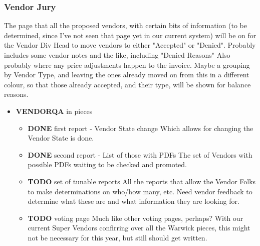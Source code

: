 \documentclass[captions=tablesignature]{scrartcl}
\begin{document}
\subsubsection{Vendor Jury}
\label{sec-3-1-11}
The page that all the proposed vendors, with certain bits of
information (to be determined, since I've not seen that page yet
in our current system) will be on for the Vendor Div Head to move
vendors to either "Accepted" or "Denied".  Probably includes some
vendor notes and the like, including "Denied Reasons" Also
probably where any price adjustments happen to the invoice.  Maybe
a grouping by Vendor Type, and leaving the ones already moved on
from this in a different colour, so that those already accepted,
and their type, will be shown for balance reasons.
\begin{itemize}
\item {\bfseries\sffamily VENDORQA} in pieces
\label{sec-3-1-11-1}
\begin{itemize}
\item {\bfseries\sffamily DONE} first report - Vendor State change
\label{sec-3-1-11-1-1}
Which allows for changing the Vendor State is done.

\item {\bfseries\sffamily DONE} second report - List of those with PDFs
\label{sec-3-1-11-1-2}
The set of Vendors with possible PDFs waiting to be checked and
promoted.

\item {\bfseries\sffamily TODO} set of tunable reports
\label{sec-3-1-11-1-3}
All the reports that allow the Vendor Folks to make
determinations on who/how many, etc.  Need vendor feedback to
determine what these are and what information they are looking
for.

\item {\bfseries\sffamily TODO} voting page
\label{sec-3-1-11-1-4}
Much like other voting pages, perhaps?  With our current Super
Vendors confirring over all the Warwick pieces, this might not
be necessary for this year, but still should get written.
\end{itemize}
\end{itemize}
\end{document}

